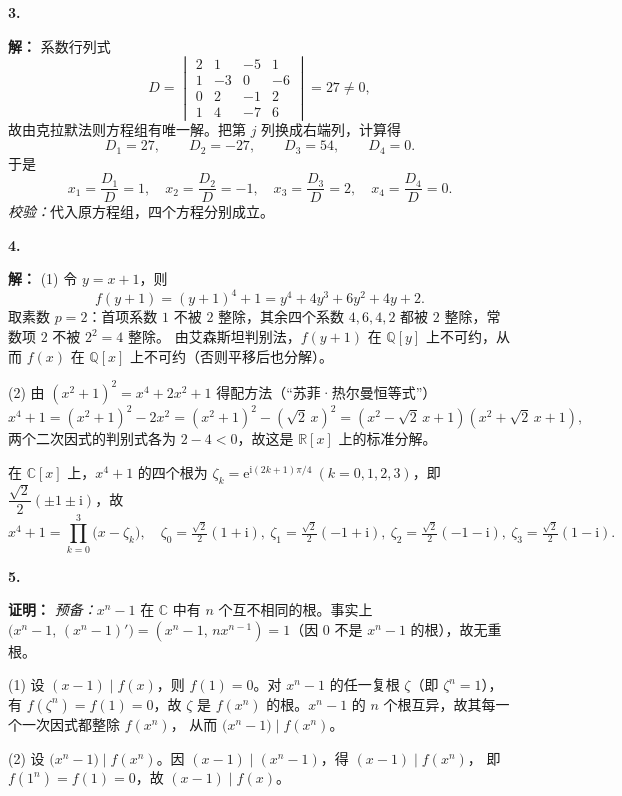 \documentclass[11pt,a4paper,fontset=windows]{ctexart}
\newcommand{\sola}[2]{\Needspace{4\baselineskip}\par\vspace{10pt}%
  \noindent\textbf{#1}\hspace{0.45em}{\small\color{hdgray}\songti #2}\par\vspace{1pt}}
\newcommand{\pf}{\textbf{证明：}}
\newcommand{\sd}{\textbf{解：}}
\begin{document}
\sola{3.}{（10 分）}\sd
系数行列式
\[
D=\begin{vmatrix}2&1&-5&1\\1&-3&0&-6\\0&2&-1&2\\1&4&-7&6\end{vmatrix}=27\neq0,
\]
故由克拉默法则方程组有唯一解。把第 $j$ 列换成右端列，计算得
\[
D_1=27,\qquad D_2=-27,\qquad D_3=54,\qquad D_4=0 .
\]
于是
\[
x_1=\frac{D_1}{D}=1,\quad x_2=\frac{D_2}{D}=-1,\quad x_3=\frac{D_3}{D}=2,\quad x_4=\frac{D_4}{D}=0 .
\]
\emph{校验：}代入原方程组，四个方程分别成立。

\sola{4.}{（10 分）}\sd
(1) 令 $y=x+1$，则
\[
f(y+1)=(y+1)^{4}+1=y^{4}+4y^{3}+6y^{2}+4y+2 .
\]
取素数 $p=2$：首项系数 $1$ 不被 $2$ 整除，其余四个系数 $4,6,4,2$ 都被 $2$ 整除，常数项 $2$ 不被 $2^{2}=4$ 整除。
由艾森斯坦判别法，$f(y+1)$ 在 $\mathbb{Q}[y]$ 上不可约，从而 $f(x)$ 在 $\mathbb{Q}[x]$ 上不可约（否则平移后也分解）。
\par
(2) 由 $(x^{2}+1)^{2}=x^{4}+2x^{2}+1$ 得配方法（“苏菲·热尔曼恒等式”）
\[
x^{4}+1=(x^{2}+1)^{2}-2x^{2}=(x^{2}+1)^{2}-(\sqrt2\,x)^{2}
=(x^{2}-\sqrt2\,x+1)(x^{2}+\sqrt2\,x+1),
\]
两个二次因式的判别式各为 $2-4<0$，故这是 $\mathbb{R}[x]$ 上的标准分解。
\par
在 $\mathbb{C}[x]$ 上，$x^{4}+1$ 的四个根为 $\zeta_k=\mathrm{e}^{\mathrm{i}(2k+1)\pi/4}\ (k=0,1,2,3)$，即
$\dfrac{\sqrt2}{2}(\pm1\pm\mathrm{i})$，故
\[
x^{4}+1=\prod_{k=0}^{3}\bigl(x-\zeta_k\bigr),
\quad
\zeta_0=\tfrac{\sqrt2}{2}(1+\mathrm{i}),\ \zeta_1=\tfrac{\sqrt2}{2}(-1+\mathrm{i}),\
\zeta_2=\tfrac{\sqrt2}{2}(-1-\mathrm{i}),\ \zeta_3=\tfrac{\sqrt2}{2}(1-\mathrm{i}).
\]

\sola{5.}{（15 分）}\pf
\emph{预备：}$x^{n}-1$ 在 $\mathbb{C}$ 中有 $n$ 个互不相同的根。事实上
$\bigl(x^{n}-1,\,(x^{n}-1)'\bigr)=(x^{n}-1,\,nx^{n-1})=1$（因 $0$ 不是 $x^{n}-1$ 的根），故无重根。
\par
(1) 设 $(x-1)\mid f(x)$，则 $f(1)=0$。对 $x^{n}-1$ 的任一复根 $\zeta$（即 $\zeta^{n}=1$），有
$f(\zeta^{n})=f(1)=0$，故 $\zeta$ 是 $f(x^{n})$ 的根。$x^{n}-1$ 的 $n$ 个根互异，故其每一个一次因式都整除 $f(x^{n})$，
从而 $\bigl(x^{n}-1\bigr)\mid f(x^{n})$。
\par
(2) 设 $\bigl(x^{n}-1\bigr)\mid f(x^{n})$。因 $(x-1)\mid(x^{n}-1)$，得 $(x-1)\mid f(x^{n})$，
即 $f(1^{n})=f(1)=0$，故 $(x-1)\mid f(x)$。
\end{document}
